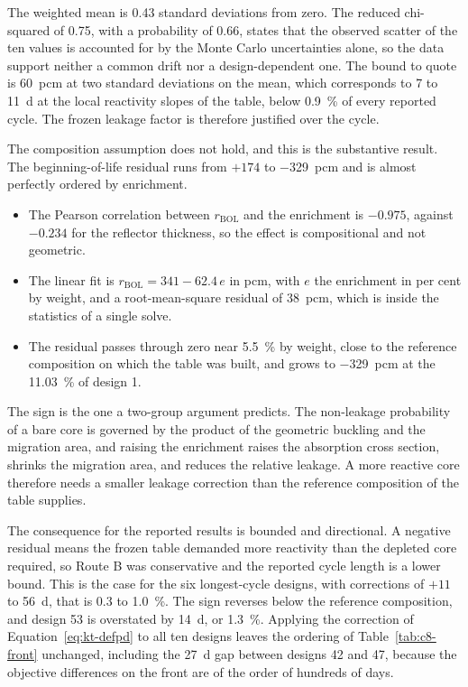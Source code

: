 The weighted mean is \num{0.43} standard deviations from zero. The
reduced chi-squared of \num{0.75}, with a probability of \num{0.66},
states that the observed scatter of the ten values is accounted for by
the Monte Carlo uncertainties alone, so the data support neither a
common drift nor a design-dependent one. The bound to quote is
\SI{60}{pcm} at two standard deviations on the mean, which corresponds
to \num{7} to \SI{11}{d} at the local reactivity slopes of the table,
below \SI{0.9}{\percent} of every reported cycle. The frozen leakage
factor is therefore justified over the cycle.

The composition assumption does not hold, and this is the substantive
result. The beginning-of-life residual runs from $+174$ to
\SI{-329}{pcm} and is almost perfectly ordered by enrichment.

\begin{itemize}
  \item The Pearson correlation between $r_\mathrm{BOL}$ and the
        enrichment is $-0.975$, against $-0.234$ for the reflector
        thickness, so the effect is compositional and not geometric.

  \item The linear fit is $r_\mathrm{BOL} = 341 - 62.4\,e$ in pcm,
        with $e$ the enrichment in per cent by weight, and a
        root-mean-square residual of \SI{38}{pcm}, which is inside the
        statistics of a single solve.

  \item The residual passes through zero near \SI{5.5}{\percent} by
        weight, close to the reference composition on which the table
        was built, and grows to \SI{-329}{pcm} at the
        \SI{11.03}{\percent} of design 1.
\end{itemize}

The sign is the one a two-group argument predicts. The non-leakage
probability of a bare core is governed by the product of the geometric
buckling and the migration area, and raising the enrichment raises the
absorption cross section, shrinks the migration area, and reduces the
relative leakage. A more reactive core therefore needs a smaller
leakage correction than the reference composition of the table
supplies.

The consequence for the reported results is bounded and directional. A
negative residual means the frozen table demanded more reactivity than
the depleted core required, so Route B was conservative and the
reported cycle length is a lower bound. This is the case for the six
longest-cycle designs, with corrections of $+11$ to \SI{+56}{d}, that
is \num{0.3} to \SI{1.0}{\percent}. The sign reverses below the
reference composition, and design 53 is overstated by \SI{14}{d}, or
\SI{1.3}{\percent}. Applying the correction of
Equation~\eqref{eq:kt-defpd} to all ten designs leaves the ordering of
Table~\ref{tab:c8-front} unchanged, including the \SI{27}{d} gap
between designs 42 and 47, because the objective differences on the
front are of the order of hundreds of days.


